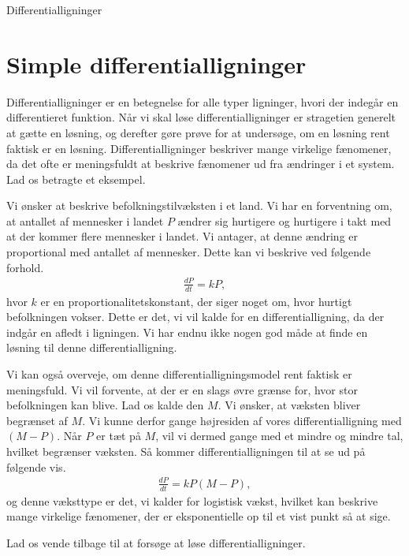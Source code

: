 \begin{center}
\Huge
	Differentialligninger
\end{center}
\section*{Simple differentialligninger}

Differentialligninger er en betegnelse for alle typer ligninger, hvori der indegår en differentieret funktion. Når vi skal løse differentialligninger er stragetien generelt at gætte en løsning, og derefter gøre prøve for at undersøge, om en løsning rent faktisk er en løsning.
Differentialligninger beskriver mange virkelige fænomener, da det ofte er meningsfuldt at beskrive fænomener ud fra ændringer i et system. Lad os betragte et eksempel.
\begin{exa}
	Vi ønsker at beskrive befolkningstilvæksten i et land. Vi har en forventning om, at antallet af mennesker i landet $P$ ændrer sig hurtigere og hurtigere i takt med at der kommer flere mennesker i landet. Vi antager, at denne ændring er proportional med antallet af mennesker. Dette kan vi beskrive ved følgende forhold.
	\begin{align*}
		\frac{dP}{dt} = kP,
	\end{align*}
	hvor $k$ er en proportionalitetskonstant, der siger noget om, hvor hurtigt befolkningen vokser. Dette er det, vi vil kalde for en differentialligning, da der indgår en afledt i ligningen. Vi har endnu ikke nogen god måde at finde en løsning til denne differentialligning.

	Vi kan også overveje, om denne differentialligningsmodel rent faktisk er meningsfuld. Vi vil forvente, at der er en slags øvre grænse for, hvor stor befolkningen kan blive. Lad os kalde den $M$. Vi ønsker, at væksten bliver begrænset af $M$. Vi kunne derfor gange højresiden af vores differentialligning med $(M-P)$. Når $P$ er tæt på $M$, vil vi dermed gange med et mindre og mindre tal, hvilket begrænser væksten. Så kommer differentialligningen til at se ud på følgende vis.
	\begin{align*}
		\frac{dP}{dt} = kP(M-P),
	\end{align*}
	og denne væksttype er det, vi kalder for logistisk vækst, hvilket kan beskrive mange virkelige fænomener, der er eksponentielle op til et vist punkt så at sige. 
\end{exa}
Lad os vende tilbage til at forsøge at løse differentialligninger.
